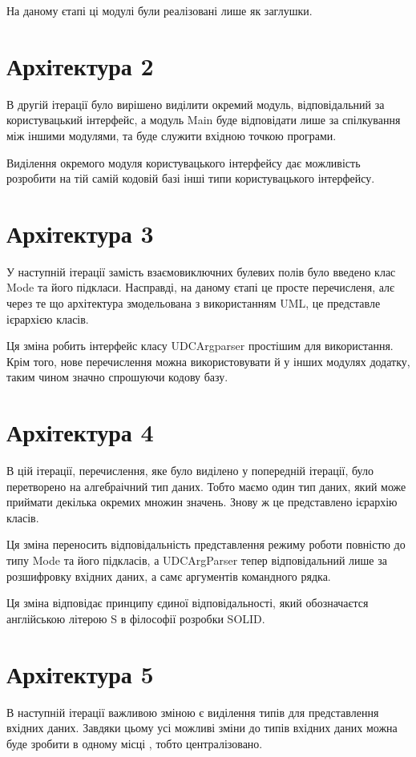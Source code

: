 \documentclass{article}
\let\oldsection\section
\renewcommand{\section}{\clearpage\oldsection}
\begin{document}
На даному єтапі ці модулі були реалізовані лише як заглушки.

\section{Архітектура 2}
В другій ітерації було вирішено виділити окремий модуль, відповідальний за користувацький інтерфейс,
а модуль Main буде відповідати лише за спілкування між іншими модулями,
та буде служити вхідною точкою програми.

Виділення окремого модуля користувацького інтерфейсу
дає можливість розробити на тій самій кодовій базі інші типи користувацького інтерфейсу. 

\section{Архітектура 3}
У наступній ітерації замість взаємовиключних булевих полів було введено клас Mode
та його підкласи. Насправді, на даному єтапі це просте перечисленя,
алє через те що архітектура змодельована з використанням UML, це представле ієрархією класів.

Ця зміна робить інтерфейс класу UDCArgparser простішим для використання.
Крім того, нове перечислення можна використовувати й у інших модулях додатку,
таким чином значно спрошуючи кодову базу.

\section{Архітектура 4}
В цій ітерації, перечислення, яке було виділено у попередній ітерації,
було перетворено на алгебраічний тип даних. Тобто маємо один тип даних,
який може приймати декілька окремих множин значень. Знову ж це представлено ієрархію класів.

Ця зміна переносить відповідальність представлення режиму роботи повністю
до типу Mode та його підкласів, а UDCArgParser тепер відповідальний лише за
розшифровку вхідних даних, а самє аргументів командного рядка.

Ця зміна відповідає принципу єдиної відповідальності,
який обозначаєтся англійською літерою S в філософії розробки SOLID.

\section{Архітектура 5}
В наступній ітерації важливою зміною є виділення типів для представлення вхідних даних.
Завдяки цьому усі можливі зміни до типів вхідних даних можна буде зробити в одному місці
, тобто централізовано.
\end{document}
